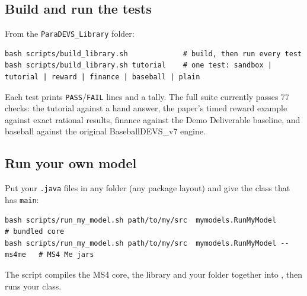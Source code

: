 \documentclass[11pt]{article}
\newcommand{\code}[1]{\texttt{#1}}
\begin{document}
\subsection{Build and run the tests}
From the \code{ParaDEVS\_Library} folder:
\begin{lstlisting}[style=plain]
bash scripts/build_library.sh             # build, then run every test
bash scripts/build_library.sh tutorial    # one test: sandbox | tutorial | reward | finance | baseball | plain
\end{lstlisting}
Each test prints \code{PASS}/\code{FAIL} lines and a tally. The full suite currently passes 77 checks: the tutorial
against a hand answer, the paper's timed reward example against exact rational results, finance against the Demo
Deliverable baseline, and baseball against the original BaseballDEVS\_v7 engine.

\subsection{Run your own model}
Put your \code{.java} files in any folder (any package layout) and give the class that has \code{main}:
\begin{lstlisting}[style=plain]
bash scripts/run_my_model.sh path/to/my/src  mymodels.RunMyModel           # bundled core
bash scripts/run_my_model.sh path/to/my/src  mymodels.RunMyModel --ms4me   # MS4 Me jars
\end{lstlisting}
The script compiles the MS4 core, the library and your folder together into , then runs your class.
\end{document}
